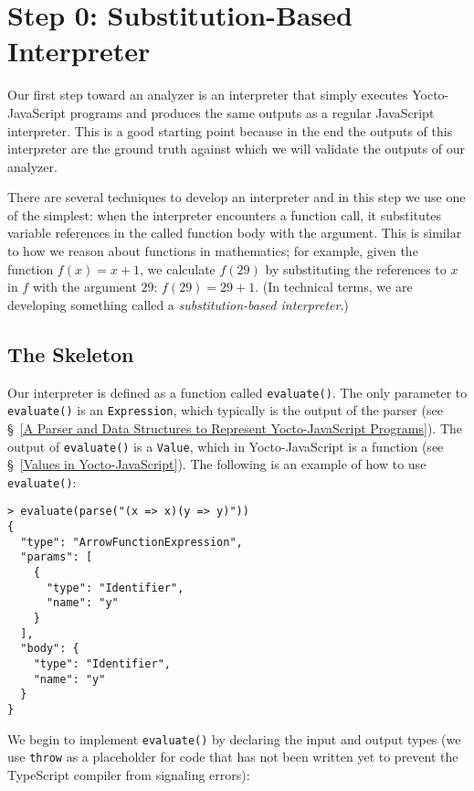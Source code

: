 \documentclass[12pt, oneside]{book}
\begin{document}
\section{Step 0: Substitution-Based Interpreter}
\label{Step 0: Substitution-Based Interpreter}

Our first step toward an analyzer is an interpreter that simply executes Yocto-JavaScript programs and produces the same outputs as a regular JavaScript interpreter. This is a good starting point because in the end the outputs of this interpreter are the ground truth against which we will validate the outputs of our analyzer.

There are several techniques to develop an interpreter and in this step we use one of the simplest: when the interpreter encounters a function call, it substitutes variable references in the called function body with the argument. This is similar to how we reason about functions in mathematics; for example, given the function $f(x) = x + 1$, we calculate $f(29)$ by substituting the references to $x$ in $f$ with the argument $29$: $f(29) = 29 + 1$. (In technical terms, we are developing something called a \emph{substitution-based interpreter}.)

\subsection{The Skeleton}

Our interpreter is defined as a function called \texttt{evaluate()}. The only parameter to \texttt{evaluate()} is an \texttt{Expression}, which typically is the output of the parser (see §~\ref{A Parser and Data Structures to Represent Yocto-JavaScript Programs}). The output of \texttt{evaluate()} is a \texttt{Value}, which in Yocto-JavaScript is a function (see §~\ref{Values in Yocto-JavaScript}). The following is an example of how to use \texttt{evaluate()}:

\begin{verbatim}
> evaluate(parse("(x => x)(y => y)"))
{
  "type": "ArrowFunctionExpression",
  "params": [
    {
      "type": "Identifier",
      "name": "y"
    }
  ],
  "body": {
    "type": "Identifier",
    "name": "y"
  }
}
\end{verbatim}

We begin to implement \texttt{evaluate()} by declaring the input and output types (we use \texttt{throw} as a placeholder for code that has not been written yet to prevent the TypeScript compiler from signaling errors):
\end{document}
